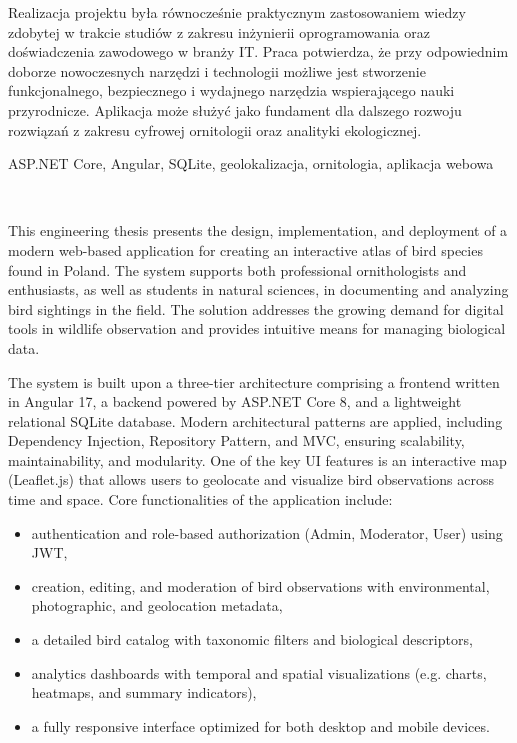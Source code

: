 Realizacja projektu była równocześnie praktycznym zastosowaniem wiedzy zdobytej w trakcie studiów z zakresu inżynierii oprogramowania oraz doświadczenia zawodowego w branży IT. Praca potwierdza, że przy odpowiednim doborze nowoczesnych narzędzi i technologii możliwe jest stworzenie funkcjonalnego, bezpiecznego i wydajnego narzędzia wspierającego nauki przyrodnicze. Aplikacja może służyć jako fundament dla dalszego rozwoju rozwiązań z zakresu cyfrowej ornitologii oraz analityki ekologicznej.


\vspace{10pt}
 ASP.NET Core, Angular, SQLite, geolokalizacja, ornitologia, aplikacja webowa

\vfill

\pagebreak

\begin{center}
\\[1cm] 
\end{center}
This engineering thesis presents the design, implementation, and deployment of a modern web-based application for creating an interactive atlas of bird species found in Poland. The system supports both professional ornithologists and enthusiasts, as well as students in natural sciences, in documenting and analyzing bird sightings in the field. The solution addresses the growing demand for digital tools in wildlife observation and provides intuitive means for managing biological data.

The system is built upon a three-tier architecture comprising a frontend written in Angular 17, a backend powered by ASP.NET Core 8, and a lightweight relational SQLite database. Modern architectural patterns are applied, including Dependency Injection, Repository Pattern, and MVC, ensuring scalability, maintainability, and modularity. One of the key UI features is an interactive map (Leaflet.js) that allows users to geolocate and visualize bird observations across time and space.
Core functionalities of the application include:
\begin{itemize}
	\item authentication and role-based authorization (Admin, Moderator, User) using JWT,
	\item creation, editing, and moderation of bird observations with environmental, photographic, and geolocation metadata,
	\item a detailed bird catalog with taxonomic filters and biological descriptors,
	\item analytics dashboards with temporal and spatial visualizations (e.g. charts, heatmaps, and summary indicators),
	\item a fully responsive interface optimized for both desktop and mobile devices.
\end{itemize}


